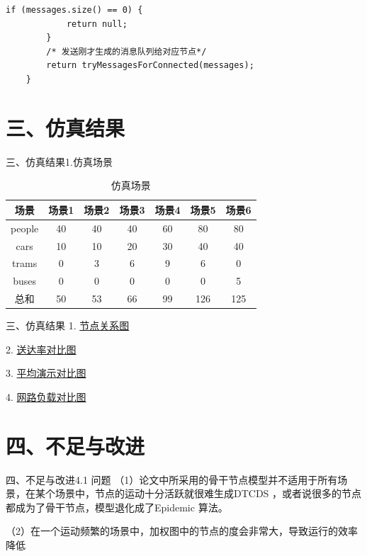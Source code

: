 \documentclass[12pt,aspectratio=43,table]{beamer}
\begin{document}
\begin{frame}[fragile]
\begin{lstlisting}
if (messages.size() == 0) {
            return null;
        }
        /* 发送刚才生成的消息队列给对应节点*/
        return tryMessagesForConnected(messages);
    }
\end{lstlisting}
\end{frame}

\section{三、仿真结果}
\begin{frame}{三、仿真结果}{1.仿真场景}
\begin{table}
  \centering
  \begin{tabular}{|c|c|c|c|c|c|c|}
		\hline  %
		场景&场景1&场景2&场景3&场景4&场景5&场景6 \\  %
		\hline
		people&40&40&40&60&80&80 \\
		\hline
		cars&10&10&20&30&40&40 \\
		\hline
        trams&0&3&6&9&6&0 \\
		\hline
        buses&0&0&0&0&0&5 \\
		\hline
        总和&50&53&66&99&126&125 \\
		\hline
	\end{tabular}
  \caption{仿真场景}\label{table1}
\end{table}
\end{frame}

\begin{frame}{三、仿真结果}
1. \href{http://rocksugar.work/iot/NodeNetwork.html}{节点关系图}

2. \href{http://rocksugar.work/iot/DeliveryProbability.html}{送达率对比图}

3. \href{http://rocksugar.work/iot/Latency.html}{平均演示对比图}

4. \href{http://rocksugar.work/iot/OverheadRatio.html}{网路负载对比图}
\end{frame}

\section{四、不足与改进}
\begin{frame}{四、不足与改进}{4.1 问题}
（1）论文中所采用的骨干节点模型并不适用于所有场景，在某个场景中，节点的运动十分活跃就很难生成DTCDS ，或者说很多的节点都成为了骨干节点，模型退化成了Epidemic 算法。

（2）在一个运动频繁的场景中，加权图中的节点的度会非常大，导致运行的效率降低
\end{frame}
\end{document}
